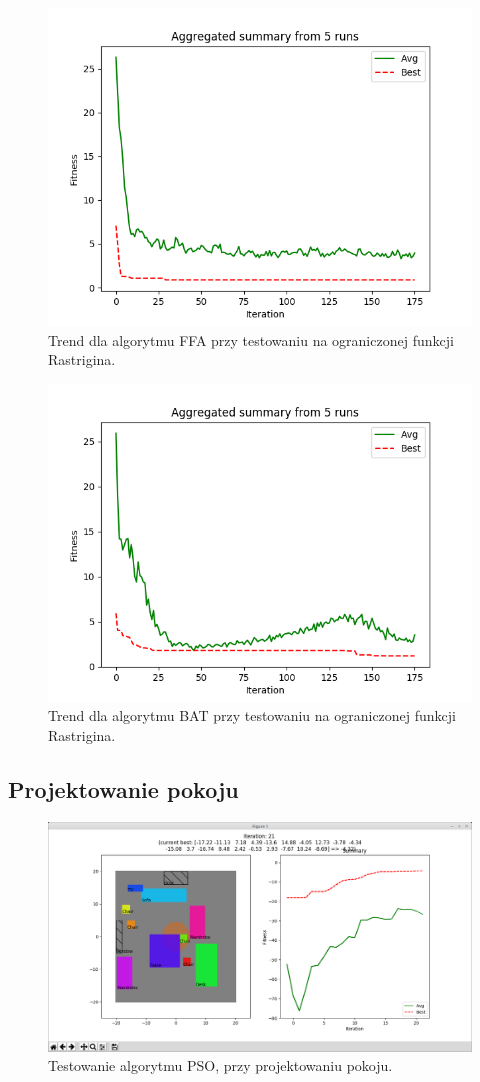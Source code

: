 \begin{figure}[H]
	\centering
	\includegraphics[width=0.7\linewidth]{analysis/limited_rastrigin/ffa_limited_rastrigin/ffa_limited_rastrigin}
	\caption{Trend dla algorytmu FFA przy testowaniu na ograniczonej funkcji Rastrigina.}
	\label{fig:ffa_limited_rastrigin}
\end{figure}

\begin{figure}[H]
	\centering
	\includegraphics[width=0.7\linewidth]{analysis/limited_rastrigin/bat_limited_rastrigin/bat_limited_rastrigin}
	\caption{Trend dla algorytmu BAT przy testowaniu na ograniczonej funkcji Rastrigina.}
	\label{fig:bat_limited_rastrigin}
\end{figure}

\subsection{Projektowanie pokoju}

\begin{figure}[H]
	\centering
	\includegraphics[width=0.7\linewidth]{imgs/program_room}
	\caption{Testowanie algorytmu PSO, przy projektowaniu pokoju.}
	\label{fig:program_room}
\end{figure}

